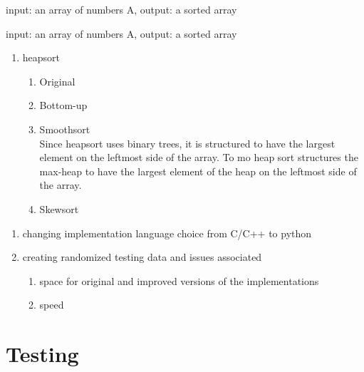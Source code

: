 \documentclass{IEEEtran}
\begin{document}
\begin{algorithm}[h!]
    \begin{algorithmic}[1]
         {input:  an array of numbers A, output: a sorted array}
        \EndFunction{}
    \end{algorithmic}
\end{algorithm}

\begin{algorithm}[h!]
    \begin{algorithmic}[1]
         {input:  an array of numbers A, output: a sorted array}
        \EndFunction{}
    \end{algorithmic}
\end{algorithm}


\begin{enumerate}
\item heapsort

\begin{enumerate}
\item Original 
\item Bottom-up
\item Smoothsort\\
Since heapsort uses binary trees, it is structured to have the largest element on the leftmost side of the array.  To mo
heap sort structures the max-heap to have the largest element of the heap on the leftmost side of the array.
\item Skewsort
\end{enumerate}

\end{enumerate}




\begin{enumerate}
\item changing implementation language choice from C/C++ to python
\item creating randomized testing data and issues associated
\begin{enumerate}
\item space for original and improved versions of the implementations
\item speed
\end{enumerate}
\end{enumerate}


\section{Testing}\label{sec:testing}
\end{document}

